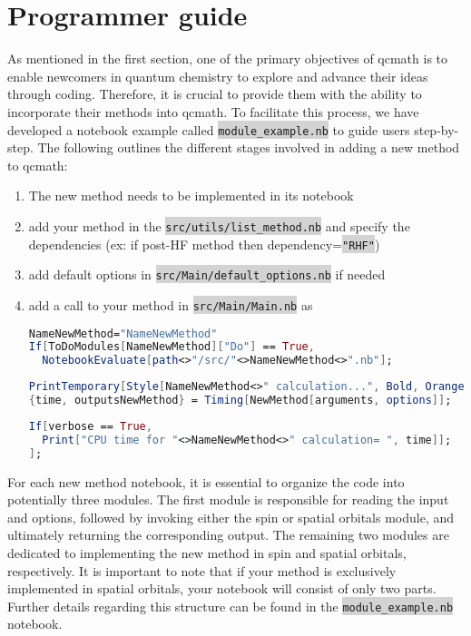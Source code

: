 \documentclass[aip,jcp,reprint,noshowkeys,superscriptaddress]{revtex4-1}
\newcommand{\keyword}[1]{{\colorbox{lightgray}{\texttt{#1}}}}
\begin{document}
\section{Programmer guide}
As mentioned in the first section, one of the primary objectives of qcmath is to enable newcomers in quantum chemistry to explore and advance their ideas through coding. Therefore, it is crucial to provide them with the ability to incorporate their methods into qcmath. To facilitate this process, we have developed a notebook example called \keyword{module\_example.nb} to guide users step-by-step. The following outlines the different stages involved in adding a new method to qcmath:
\begin{enumerate}
\item The new method needs to be implemented in its notebook
\item add your method in the \keyword{src/utils/list\_method.nb} and specify the dependencies (ex: if post-HF method then dependency=\keyword{"RHF"})
\item add default options in \keyword{src/Main/default\_options.nb} if needed
\item add a call to your method in \keyword{src/Main/Main.nb} as
\begin{lstlisting}[extendedchars=true,language=Mathematica]
NameNewMethod="NameNewMethod"
If[ToDoModules[NameNewMethod]["Do"] == True,
  NotebookEvaluate[path<>"/src/"<>NameNewMethod<>".nb"];
\end{lstlisting}
\begin{lstlisting}[extendedchars=true,language=Mathematica]
PrintTemporary[Style[NameNewMethod<>" calculation...", Bold, Orange]];
{time, outputsNewMethod} = Timing[NewMethod[arguments, options]];	
\end{lstlisting}
\begin{lstlisting}[extendedchars=true,language=Mathematica]
If[verbose == True, 
  Print["CPU time for "<>NameNewMethod<>" calculation= ", time]];
];
\end{lstlisting}
\end{enumerate}
For each new method notebook, it is essential to organize the code into potentially three modules. The first module is responsible for reading the input and options, followed by invoking either the spin or spatial orbitals module, and ultimately returning the corresponding output. The remaining two modules are dedicated to implementing the new method in spin and spatial orbitals, respectively. It is important to note that if your method is exclusively implemented in spatial orbitals, your notebook will consist of only two parts. Further details regarding this structure can be found in the \keyword{module\_example.nb} notebook.


\end{document}
